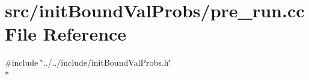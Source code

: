\section{src/init\-Bound\-Val\-Probs/pre\-\_\-run.cc File Reference}
\label{pre__run_8cc}
{\ttfamily \#include \char`\"{}../../include/init\-Bound\-Val\-Probs.\-h\char`\"{}}\\*
